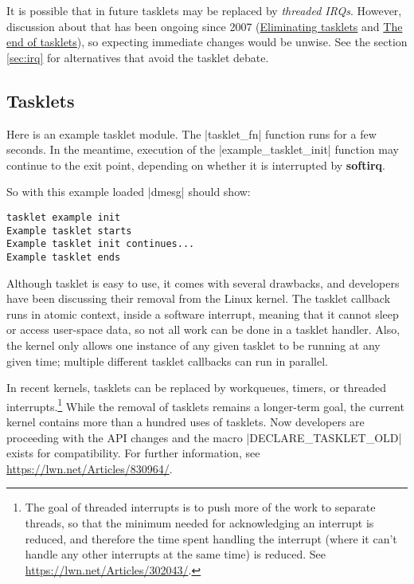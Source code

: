\documentclass[10pt, oneside]{book}
\begin{document}
It is possible that in future tasklets may be replaced by \textit{threaded IRQs}.
However, discussion about that has been ongoing since 2007 (\href{https://lwn.net/Articles/239633}{Eliminating tasklets} and \href{https://lwn.net/Articles/960041/}{The end of tasklets}),
so expecting immediate changes would be unwise.
See the section \ref{sec:irq} for alternatives that avoid the tasklet debate.

\subsection{Tasklets}
\label{sec:tasklet}
Here is an example tasklet module.
The \cpp|tasklet_fn| function runs for a few seconds.
In the meantime, execution of the \cpp|example_tasklet_init| function may continue to the exit point,
depending on whether it is interrupted by \textbf{softirq}.


So with this example loaded \sh|dmesg| should show:

\begin{verbatim}
tasklet example init
Example tasklet starts
Example tasklet init continues...
Example tasklet ends
\end{verbatim}
Although tasklet is easy to use, it comes with several drawbacks, and developers have been discussing their removal from the Linux kernel.
The tasklet callback runs in atomic context, inside a software interrupt, meaning that it cannot sleep or access user-space data, so not all work can be done in a tasklet handler.
Also, the kernel only allows one instance of any given tasklet to be running at any given time; multiple different tasklet callbacks can run in parallel.

In recent kernels, tasklets can be replaced by workqueues, timers, or threaded interrupts.\footnote{The goal of threaded interrupts is to push more of the work to separate threads, so that the minimum needed for acknowledging an interrupt is reduced, and therefore the time spent handling the interrupt (where it can't handle any other interrupts at the same time) is reduced.
See \url{https://lwn.net/Articles/302043/}.}
While the removal of tasklets remains a longer-term goal, the current kernel contains more than a hundred uses of tasklets.
Now developers are proceeding with the API changes and the macro \cpp|DECLARE_TASKLET_OLD| exists for compatibility.
For further information, see \url{https://lwn.net/Articles/830964/}.
\end{document}
